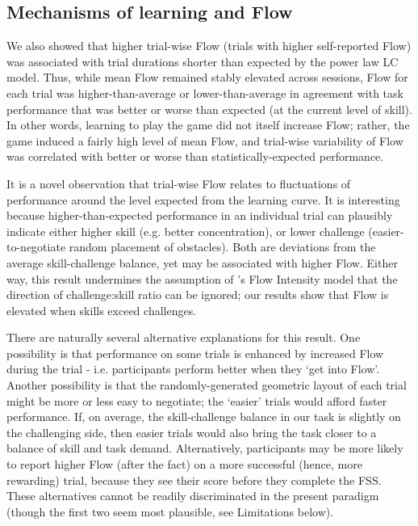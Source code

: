 \documentclass{frontierstyle/frontiersSCNS}
\begin{document}
\subsection{Mechanisms of learning and Flow}
We also showed that higher trial-wise Flow (trials with higher self-reported Flow) was associated with trial durations shorter than expected by the power law LC model. Thus, while mean Flow remained stably elevated across sessions, Flow for each trial was higher-than-average or lower-than-average in agreement with task performance that was better or worse than expected (at the current level of skill). In other words, learning to play the game did not itself increase Flow; rather, the game induced a fairly high level of mean Flow, and trial-wise variability of Flow was correlated with better or worse than statistically-expected performance.

It is a novel observation that trial-wise Flow relates to fluctuations of performance around the level expected from the learning curve. It is interesting because higher-than-expected performance in an individual trial can plausibly indicate either higher skill (e.g. better concentration), or lower challenge (easier-to-negotiate random placement of obstacles). Both are deviations from the average skill-challenge balance, yet may be associated with higher Flow. Either way, this result undermines the assumption of \cite{Keller2012}'s Flow Intensity model that the direction of challenge:skill ratio can be ignored; our results show that Flow is elevated when skills exceed challenges.

There are naturally several alternative explanations for this result. One possibility is that performance on some trials is enhanced by increased Flow during the trial - i.e. participants perform better when they `get into Flow'. Another possibility is that the randomly-generated geometric layout of each trial might be more or less easy to negotiate; the `easier' trials would afford faster performance. If, on average, the skill-challenge balance in our task is slightly on the challenging side, then easier trials would also bring the task closer to a balance of skill and task demand. Alternatively, participants may be more likely to report higher Flow (after the fact) on a more successful (hence, more rewarding) trial, because they see their score before they complete the FSS. These alternatives cannot be readily discriminated in the present paradigm (though the first two seem most plausible, see Limitations below).
\end{document}
